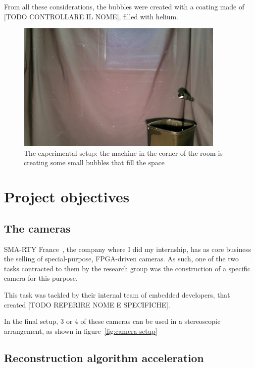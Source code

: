 From all these considerations, the bubbles were created with a coating made of [TODO CONTROLLARE IL NOME], filled with helium.

\begin{figure}
	\centerline{\includegraphics[width=0.9\textwidth]{images/experimental-setup.png}}
	\caption{\centering The experimental setup: the machine in the corner of the room is creating some small bubbles that fill the space}
	\label{fig:experimetal-setup}
\end{figure}

\section{Project objectives}

\subsection{The cameras}

SMA-RTY France~\cite{smarty-website}, the company where I did my internship, has as core business the selling of special-purpose, FPGA-driven cameras.
As such, one of the two tasks contracted to them by the research group was the construction of a specific camera for this purpose.

This task was tackled by their internal team of embedded developers, that created [TODO REPERIRE NOME E SPECIFICHE].

In the final setup, 3 or 4 of these cameras can be used in a stereoscopic arrangement, as shown in figure~\ref{fig:camera-setup}

\subsection{Reconstruction algorithm acceleration}

